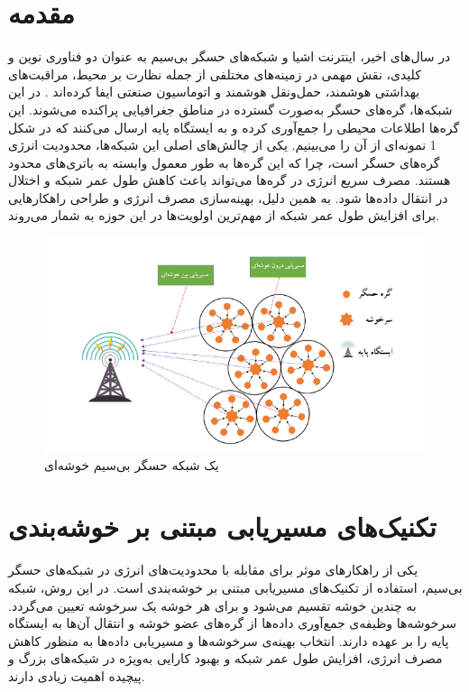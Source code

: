 \documentclass[11.5pt,onecolumn,a4paper]{article}
\begin{document}
	\section{مقدمه}
	\hspace*{1em}در سال‌های اخیر، اینترنت اشیا  و شبکه‌های حسگر بی‌سیم به عنوان دو فناوری نوین و کلیدی، نقش مهمی در زمینه‌های مختلفی از جمله نظارت بر محیط، مراقبت‌های بهداشتی هوشمند، حمل‌ونقل هوشمند و اتوماسیون صنعتی ایفا کرده‌اند \cite{ref1, ref2, ref3}. در این شبکه‌ها، گره‌های حسگر به‌صورت گسترده در مناطق جغرافیایی پراکنده می‌شوند. این گره‌ها اطلاعات محیطی را جمع‌آوری کرده و به ایستگاه‌ پایه ارسال می‌کنند که در شکل 1 نمونه‌ای از آن را می‌بینیم.  یکی از چالش‌های اصلی این شبکه‌ها، محدودیت انرژی گره‌های حسگر است، چرا که این گره‌ها به طور معمول وابسته به باتری‌های محدود هستند. مصرف سریع انرژی در گره‌ها می‌تواند باعث کاهش طول عمر شبکه و اختلال در انتقال داده‌ها شود. به همین دلیل، بهینه‌سازی مصرف انرژی و طراحی راهکارهایی برای افزایش طول عمر شبکه از مهم‌ترین اولویت‌ها در این حوزه به‌ شمار می‌روند.
	\begin{figure}[h] %
		\centering %
		\includegraphics[width=\textwidth]{cluster-persian.png} %
		\caption{یک شبکه حسگر بی‌سیم خوشه‌ای} %
		\label{fig:your_label} %
	\end{figure}
	

	
	\section*{تکنیک‌های مسیریابی مبتنی بر خوشه‌بندی}
	\hspace*{1em}یکی از راهکارهای موثر برای مقابله با محدودیت‌های انرژی در شبکه‌های حسگر بی‌سیم، استفاده از تکنیک‌های مسیریابی مبتنی بر خوشه‌بندی است. در این روش، شبکه به چندین خوشه تقسیم می‌شود و برای هر خوشه یک سرخوشه تعیین می‌گردد. سرخوشه‌ها وظیفه‌ی جمع‌آوری داده‌ها از گره‌های عضو خوشه و انتقال آن‌ها به ایستگاه پایه را بر عهده دارند. انتخاب بهینه‌ی سرخوشه‌ها و مسیریابی داده‌ها به منظور کاهش مصرف انرژی، افزایش طول عمر شبکه و بهبود کارایی به‌ویژه در شبکه‌های بزرگ و پیچیده اهمیت زیادی دارند.
	
\end{document}
